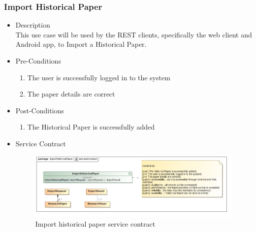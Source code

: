 \documentclass[a4paper,10pt]{article}
\begin{document}
\subsubsection{Import Historical Paper}
	\begin{itemize}
		\item Description\\
			This use case will be used by the REST clients, specifically the web client and Android app, to Import a Historical Paper.
		\item Pre-Conditions
			\begin{enumerate}
				\item The user is successfully logged in to the system
				\item The paper details are correct
			\end{enumerate}
		\item Post-Conditions
			\begin{enumerate}
				\item The Historical Paper is successfully added
						
			\end{enumerate}
		\item Service Contract
		\begin{figure}[H]
			\includegraphics[scale=0.5]{ImportHistoricalPaperServiceContract}
			\caption{Import historical paper service contract}
		\end{figure}
	\end{itemize}
\end{document}
